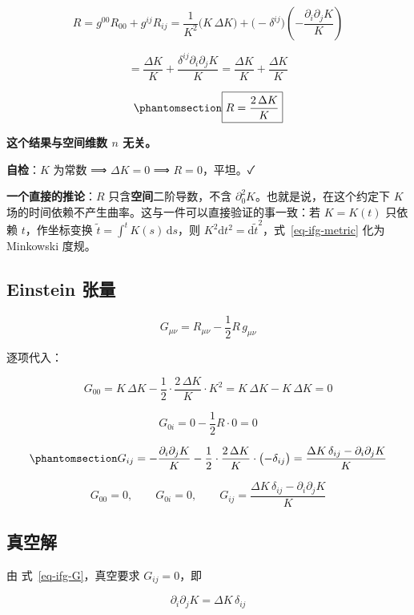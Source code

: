 \documentclass[
  chinese,
  a4paper,
  UTF8,
  12pt,
  oneside,
  openany]{ctexbook}
\theoremstyle{plain}
\theoremstyle{plain}
\theoremstyle{plain}
\theoremstyle{definition}
\theoremstyle{plain}
\theoremstyle{plain}
\theoremstyle{remark}
\begin{document}
\[
R=g^{00}R_{00}+g^{ij}R_{ij}
=\frac{1}{K^{2}}\bigl(K\,\Delta K\bigr)
+\bigl(-\delta^{ij}\bigr)\left(-\frac{\partial_i\partial_jK}{K}\right)
\]

\[
=\frac{\Delta K}{K}+\frac{\delta^{ij}\partial_i\partial_jK}{K}
=\frac{\Delta K}{K}+\frac{\Delta K}{K}
\]

\begin{equation}\protect\phantomsection\label{eq-ifg-R}{
\boxed{R=\frac{2\,\Delta K}{K}}
}\end{equation}

\textbf{这个结果与空间维数 \(n\) 无关。}

\textbf{自检}：\(K\) 为常数 ⟹ \(\Delta K=0\) ⟹ \(R=0\)，平坦。✓

\textbf{一个直接的推论}：\(R\) 只含\textbf{空间}二阶导数，不含
\(\partial_0^{2}K\)。也就是说，在这个约定下 \(K\)
场的时间依赖不产生曲率。这与一件可以直接验证的事一致：若 \(K=K(t)\)
只依赖 \(t\)，作坐标变换 \(\tilde t=\int^{t}K(s)\,\mathrm{d}s\)，则
\(K^{2}\mathrm{d}t^{2}=\mathrm{d}\tilde t^{2}\)，式~\ref{eq-ifg-metric}
化为 Minkowski 度规。

\subsection{Einstein 张量}\label{einstein-ux5f20ux91cf}

\[
G_{\mu\nu}=R_{\mu\nu}-\frac{1}{2}R\,g_{\mu\nu}
\]

逐项代入：

\[
G_{00}=K\,\Delta K-\frac{1}{2}\cdot\frac{2\,\Delta K}{K}\cdot K^{2}
=K\,\Delta K-K\,\Delta K=0
\]

\[
G_{0i}=0-\frac{1}{2}R\cdot 0=0
\]

\begin{equation}\protect\phantomsection\label{eq-ifg-G}{
G_{ij}=-\frac{\partial_i\partial_jK}{K}
-\frac{1}{2}\cdot\frac{2\,\Delta K}{K}\cdot\bigl(-\delta_{ij}\bigr)
=\frac{\Delta K\,\delta_{ij}-\partial_i\partial_jK}{K}
}\end{equation}

\[
\boxed{G_{00}=0,\qquad G_{0i}=0,\qquad
G_{ij}=\frac{\Delta K\,\delta_{ij}-\partial_i\partial_jK}{K}}
\]

\subsection{真空解}\label{ux771fux7a7aux89e3}

由 式~\ref{eq-ifg-G}，真空要求 \(G_{ij}=0\)，即

\[
\partial_i\partial_jK=\Delta K\,\delta_{ij}
\]
\end{document}
